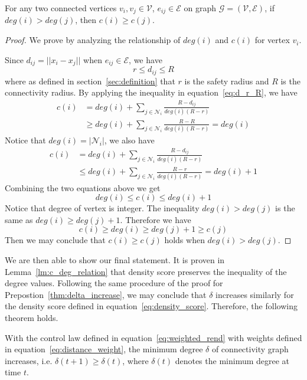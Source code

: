 \documentclass[../main.tex]{subfiles}
\begin{document}
\begin{lemma}\label{lm:c_deg_relation}
For any two connected vertices $v_i, v_j \in \mathcal{V}$, $e_{ij} \in \mathcal{E}$ on graph $\mathcal{G} = (\mathcal{V}, \mathcal{E})$, if $deg(i) > deg(j)$, then $c(i) \geq c(j)$.
\end{lemma}
\begin{proof}
We prove by analyzing the relationship of $deg(i)$ and $c(i)$ for vertex $v_i$.

Since $d_{ij} = ||x_i - x_j||$ when $e_{ij} \in \mathcal{E}$, we have
\begin{equation} \label{eq:d_r_R}  
r \leq d_{ij} \leq R
\end{equation}
where as defined in section~\ref{sec:definition} that $r$ is the safety radius and $R$ is the connectivity radius. By applying the inequality in equation~\ref{eq:d_r_R}, we have
{\small \begin{align*}
c(i) &= deg(i) + \sum_{j \in \mathcal{N}_i} \frac{R - d_{ij}}{deg(i) (R - r)} \\
&\geq deg(i) + \sum_{j \in \mathcal{N}_i} \frac{R - R}{deg(i) (R - r)} = deg(i)
\end{align*}}
Notice that $deg(i) = |\mathcal{N}_i|$, we also have
{\small \begin{align*}
c(i) &= deg(i) + \sum_{j \in \mathcal{N}_i} \frac{R - d_{ij}}{deg(i) (R - r)} \\
&\leq deg(i) + \sum_{j \in \mathcal{N}_i} \frac{R - r}{deg(i) (R - r)} = deg(i) + 1
\end{align*}}
Combining the two equations above we get
\begin{equation} 
deg(i) \leq c(i) \leq deg(i) + 1
\end{equation}
Notice that degree of vertex is integer. The inequality $deg(i) > deg(j)$ is the same as $deg(i) \geq deg(j) + 1$. Therefore we have
\begin{equation} 
c(i) \geq deg(i) \geq deg(j) + 1 \geq c(j)
\end{equation}
Then we may conclude that $c(i) \geq c(j)$ holds when $deg(i) > deg(j)$.
\end{proof}
We are then able to show our final statement. It is proven in Lemma~\ref{lm:c_deg_relation} that density score preserves the inequality of the degree values. Following the same procedure of the proof for Prepostion~\ref{thm:delta_increase}, we may conclude that $\delta$ increases similarly for the density score defined in equation~\ref{eq:density_score}. Therefore, the following theorem holds.
\begin{theorem}
With the control law defined in equation~\ref{eq:weighted_rend} with weights defined in equation~\ref{eq:distance_weight}, the minimum degree $\delta$ of connectivity graph increases, i.e. $\delta(t+1) \geq \delta(t)$, where $\delta(t)$ denotes the minimum degree at time $t$. 
\end{theorem}
\end{document}
